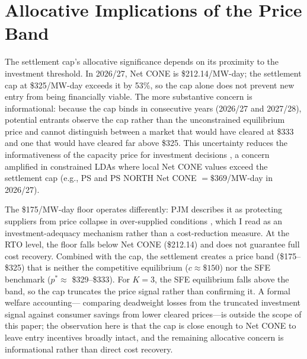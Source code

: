 
\section{Allocative Implications of the Price Band}
\label{sec:allocative_cost}

The settlement cap's allocative significance depends on its proximity to the
investment threshold. In 2026/27, Net CONE is \$212.14/MW-day; the settlement
cap at \$325/MW-day exceeds it by 53\%, so the cap alone does not prevent new
entry from being financially viable. The more substantive concern is
informational: because the cap binds in consecutive years (2026/27 and
2027/28), potential entrants observe the cap rather than the unconstrained
equilibrium price and cannot distinguish between a market that would have
cleared at \$333 and one that would have cleared far above \$325. This
uncertainty reduces the informativeness of the capacity price for investment
decisions \citep{Hogan2005_energy_adequacy, Joskow2008_capacity_payments}, a
concern amplified in
constrained LDAs where local Net CONE values exceed the settlement cap
(e.g., PS and PS NORTH Net CONE $= \$369$/MW-day in 2026/27).

The \$175/MW-day floor operates differently: PJM describes it as protecting
suppliers from price collapse in over-supplied conditions
\citep{PJM2025_settlement_slides}, which I read as an investment-adequacy
mechanism rather than a cost-reduction measure. At
the RTO level, the floor falls below Net CONE (\$212.14) and does not
guarantee full cost recovery. Combined with the cap, the settlement creates
a price band (\$175--\$325) that is neither the competitive equilibrium
($c \approx \$150$) nor the SFE benchmark ($p^* \approx$ \$329--\$333).
For $K = 3$, the SFE equilibrium falls above the band, so the cap truncates
the price signal rather than confirming it. A formal welfare accounting---
comparing deadweight losses from the truncated investment signal against
consumer savings from lower cleared prices---is outside the scope of this
paper; the observation here is that the cap is close enough to Net CONE to
leave entry incentives broadly intact, and the remaining allocative concern
is informational rather than direct cost recovery.

